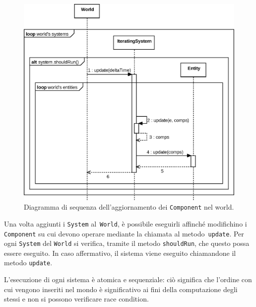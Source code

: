 \begin{figure}[H]
    \centering
    \includegraphics[width=\textwidth]{./img/Sequence}
    \caption{Diagramma di sequenza dell'aggiornamento dei \texttt{Component} nel world.}\label{fig:sequence}
\end{figure}

Una volta aggiunti i \texttt{System} al~\texttt{World}, è possibile eseguirli affinché modifichino i \texttt{Component}
su cui devono operare mediante la chiamata al metodo~\texttt{update}.
Per ogni \texttt{System} del \texttt{World} si verifica, tramite il metodo \texttt{shouldRun}, che questo possa essere
eseguito.
In caso affermativo, il sistema viene eseguito chiamandone il metodo \texttt{update}.

L'esecuzione di ogni sistema è atomica e sequenziale: ciò significa che l'ordine con cui vengono inseriti nel
mondo è significativo ai fini della computazione degli stessi e non si possono verificare race condition.

